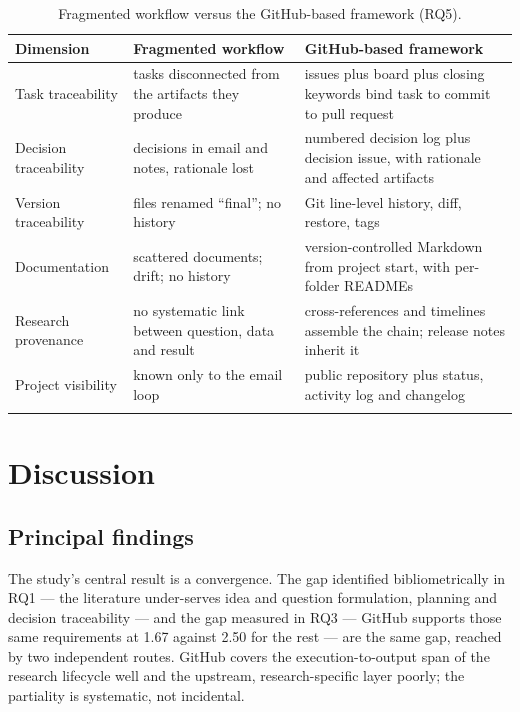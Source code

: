 \documentclass[pdflatex,sn-mathphys-num]{sn-jnl}%
\begin{document}
\begin{table}[h]
\caption{Fragmented workflow versus the GitHub-based framework (RQ5).}\label{tab:comparison}
\begin{tabular}{@{}p{2.4cm}p{4.6cm}p{4.6cm}@{}}
\toprule
Dimension & Fragmented workflow & GitHub-based framework \\
\midrule
Task traceability & tasks disconnected from the artifacts they produce & issues plus board plus closing keywords bind task to commit to pull request \\
Decision traceability & decisions in email and notes, rationale lost & numbered decision log plus decision issue, with rationale and affected artifacts \\
Version traceability & files renamed ``final''; no history & Git line-level history, diff, restore, tags \\
Documentation & scattered documents; drift; no history & version-controlled Markdown from project start, with per-folder READMEs \\
Research provenance & no systematic link between question, data and result & cross-references and timelines assemble the chain; release notes inherit it \\
Project visibility & known only to the email loop & public repository plus status, activity log and changelog \\
\botrule
\end{tabular}
\end{table}


\section{Discussion}\label{sec:discussion}

\subsection{Principal findings}\label{sec:d-principal}

The study's central result is a convergence. The gap identified bibliometrically in RQ1 --- the literature under-serves idea and question formulation, planning and decision traceability --- and the gap measured in RQ3 --- GitHub supports those same requirements at 1.67 against 2.50 for the rest --- are the same gap, reached by two independent routes. GitHub covers the execution-to-output span of the research lifecycle well and the upstream, research-specific layer poorly; the partiality is systematic, not incidental.
\end{document}
